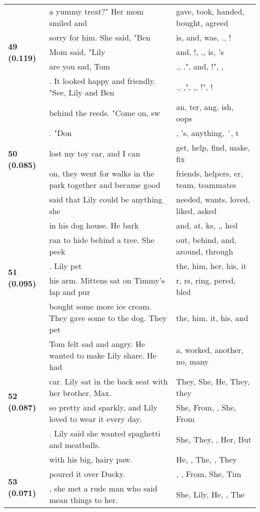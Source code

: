 \documentclass{article}
\begin{document}
\begin{adjustbox}{max width=\textwidth}
\begin{tabular}{p{} p{} p{}}
\midrule
\multirow{5}{*}{\textbf{49 (0.119)}} & a yummy treat?"  Her mom smiled and & gave,  took,  handed,  bought,  agreed \\
 & sorry for him. She said, "Ben & is,  and,  was, ., ! \\
 & Mom said, "Lily & and, !, .,  is, 's \\
 & are you sad, Tom & ., .",  and, !", , \\
 & . It looked happy and friendly.  "See, Lily and Ben & ., ,", ,, !", ! \\
\midrule
\multirow{5}{*}{\textbf{50 (0.085)}} & behind the reeds.  "Come on, sw & an, ter, ang, ish, oops \\
 & . "Don & , 's,  anything, ´, t \\
 & lost my toy car, and I can & get,  help,  find,  make,  fix \\
 & on, they went for walks in the park together and became good & friends,  helpers, er,  team,  teammates \\
 & said that Lily could be anything she & needed,  wants,  loved,  liked,  asked \\
\midrule
\multirow{5}{*}{\textbf{51 (0.095)}} & in his dog house. He bark & and,  at, ks, ,, hed \\
 & ran to hide behind a tree. She peek & out,  behind,  and,  around,  through \\
 & . Lily pet & the,  him,  her,  his,  it \\
 & his arm. Mittens sat on Timmy's lap and pur & r, rs, ring, pered, bled \\
 & bought some more ice cream. They gave some to the dog. They pet & the,  him,  it,  his,  and \\
\midrule
\multirow{5}{*}{\textbf{52 (0.087)}} & Tom felt sad and angry. He wanted to make Lily share. He had & a,  worked,  another,  no,  many \\
 & car. Lily sat in the back seat with her brother, Max. & They,  She,  He, They, they \\
 & so pretty and sparkly, and Lily loved to wear it every day. & She,  From,  , She, From \\
 & . Lily said she wanted spaghetti and meatballs. & She,  They,  ,  Her,  But \\
 & with his big, hairy paw. & He,  ,  The,   ,  They \\
\midrule
\multirow{5}{*}{\textbf{53 (0.071)}} & poured it over Ducky. & ,   ,  From,  She,  Tim \\
 & , she met a rude man who said mean things to her. & She,  Lily,  He,  ,  The \\

\end{tabular}
\end{adjustbox}
\end{document}
